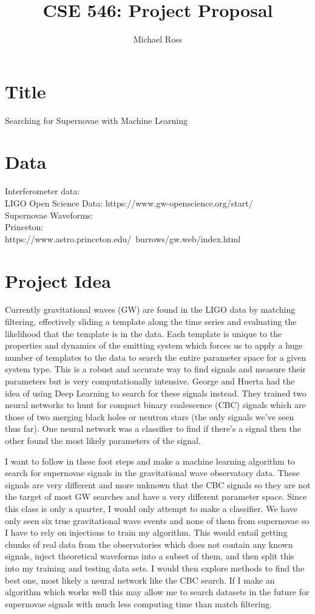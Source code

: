 \documentclass{article}
\title{\vspace{-5ex}CSE 546: Project Proposal}
\author{Michael Ross}
\date{\vspace{-5ex}}
\begin{document}
\maketitle

\section*{\large Title}
Searching for Supernovae with Machine Learning

\section*{\large Data}
 Interferometer data:\\
	LIGO Open Science Data: https://www.gw-openscience.org/start/\\
Supernovae Waveforms: \\
	Princeton:\\
		https://www.astro.princeton.edu/~burrows/gw.web/index.html\\
		
\section*{\large Project Idea}

\quad Currently gravitational waves (GW) are found in the LIGO data by matching filtering, effectively sliding a template along the time series and evaluating the likelihood that the template is in the data. Each template is unique to the properties and dynamics of the emitting system which forces us to apply a huge number of templates to the data to search the entire parameter space for a given system type. This is a robust and accurate way to find signals and measure their parameters but is very computationally intensive. George and Huerta had the idea of using Deep Learning to search for these signals instead. They trained two neural networks to hunt for compact binary coalescence (CBC) signals which are those of two merging black holes or neutron stars (the only signals we've seen thus far). One neural network was a classifier to find if there's a signal then the other found the most likely parameters of the signal.

\quad I want to follow in these foot steps and make a machine learning algorithm to search for supernovae signals in the gravitational wave observatory data. These signals are very different and more unknown that the CBC signals so they are not the target of most GW searches and have a very different parameter space. Since this class is only a quarter, I would only attempt to make a classifier. We have only seen six true gravitational wave events and none of them from supernovae so I have to rely on injections to train my algorithm. This would entail getting chunks of real data from the observatories which does not contain any known signals, inject theoretical waveforms into a subset of them, and then split this into my training and testing data sets. I would then explore methods to find the best one, most likely a neural network like the CBC search. If I make an algorithm which works well this may allow me to search datasets in the future for supernovae signals with much less computing time than match filtering.
\end{document}
